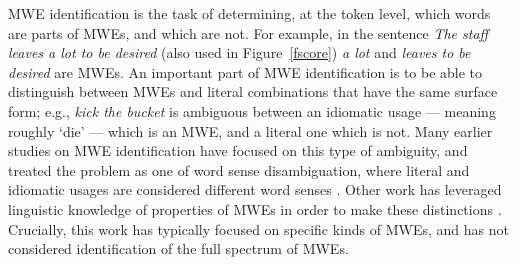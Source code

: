 \documentclass[11pt,a4paper]{article}
\newcommand{\figref}[1]{Figure~\ref{#1}}
\begin{document}
MWE identification is the task of determining, at the token level,
which words are parts of MWEs, and which are not. For example, in the
sentence \emph{The staff leaves a lot to be desired} (also used in
\figref{fscore}) \emph{a lot} and \emph{leaves
  \underline{\phantom{xxx}} to be desired} are MWEs. An important part
of MWE identification is to be able to distinguish between MWEs and
literal combinations that have the same surface form; e.g., \emph{kick
  the bucket} is ambiguous between an idiomatic usage --- meaning
roughly `die' --- which is an MWE, and a literal one which is
not. Many earlier studies on MWE identification have focused on this
type of ambiguity, and treated the problem as one of word sense
disambiguation, where literal and idiomatic usages are considered
different word senses \cite{Birke2006,Katz2006,Li+:2010}. Other work
has leveraged linguistic knowledge of properties of MWEs in order to
make these distinctions
\cite{Uchiyama2005,Fazly2009,Fothergill:Baldwin:2012}. Crucially, this
work has typically focused on specific kinds of MWEs, and has not
considered identification of the full spectrum of MWEs.




\end{document}
